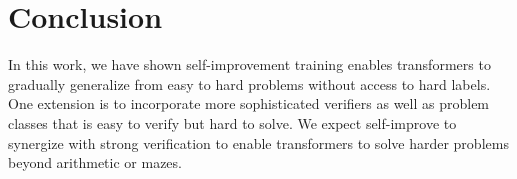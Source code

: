 \section{Conclusion}\label{sec:conclusion}


In this work, we have shown self-improvement training enables transformers to gradually generalize from easy to hard problems without access to hard labels. One extension is to incorporate more sophisticated verifiers as well as problem classes that is easy to verify but hard to solve. We expect self-improve to synergize with strong verification to enable transformers to solve harder problems beyond arithmetic or mazes. 

